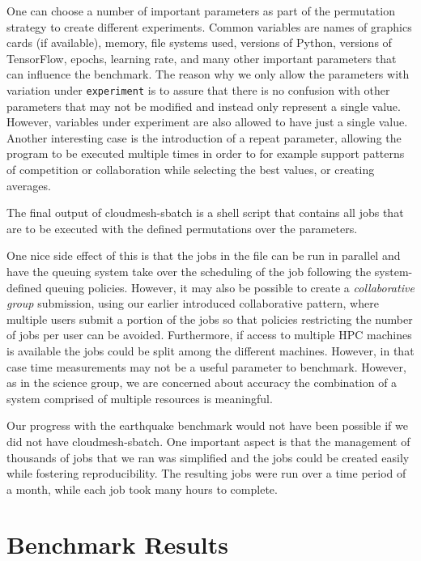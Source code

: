 \documentclass[utf8]{FrontiersinVancouver} %
\begin{document}
One can choose a number of important parameters as part of the
permutation strategy to create different experiments. Common variables
are names of graphics cards (if available), memory, file systems used,
versions of Python, versions of TensorFlow, epochs, learning rate, and
many other important parameters that can influence the benchmark.  The
reason why we only allow the parameters with variation under
\verb|experiment| is to assure that there is no confusion with other
parameters that may not be modified and instead only represent a
single value. However, variables under experiment are also allowed to have
just a single value.  Another interesting case is the introduction of
a repeat parameter, allowing the program to be executed multiple times
in order to for example support patterns of competition or
collaboration while selecting the best values, or creating averages.


The final output of cloudmesh-sbatch is a shell script that contains
all jobs that are to be executed with the defined permutations over the
parameters.

One nice side effect of this is that the jobs in the file can be run
in parallel and have the queuing system take over the scheduling of
the job following the system-defined queuing policies. However, it may
also be possible to create a {\it collaborative group} submission,
using our earlier introduced collaborative pattern, where multiple
users submit a portion of the jobs so that policies restricting the
number of jobs per user can be avoided. Furthermore, if access to
multiple HPC machines is available the jobs could be split among the
different machines. However, in that case time measurements may
not be a useful parameter to benchmark. However, as in the science group, we are
concerned about accuracy the combination of a system comprised of
multiple resources is meaningful.

Our progress with the earthquake benchmark would not have been
possible if we did not have cloudmesh-sbatch. One important aspect
is that the management of thousands of jobs that we ran was simplified
and the jobs could be created easily while fostering
reproducibility. The resulting jobs were run over a time period of a
month, while each job took many hours to complete.



\section{Benchmark Results}
\label{sec:results}
\end{document}
